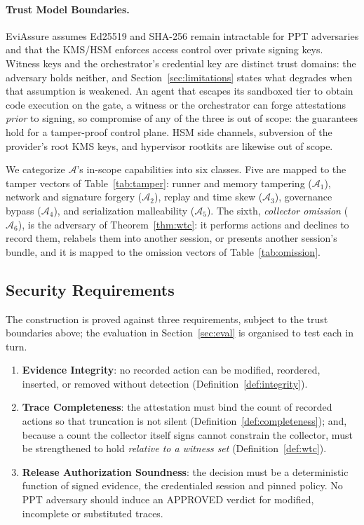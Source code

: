 \documentclass[letterpaper,10pt,twocolumn]{article}
\theoremstyle{definition}
\begin{document}
\paragraph{Trust Model Boundaries.} EviAssure assumes Ed25519 and SHA-256 remain intractable for PPT adversaries and that the KMS/HSM enforces access control over private signing keys. Witness keys and the orchestrator's credential key are distinct trust domains: the adversary holds neither, and Section~\ref{sec:limitations} states what degrades when that assumption is weakened. An agent that escapes its sandboxed tier to obtain code execution on the gate, a witness or the orchestrator can forge attestations \emph{prior} to signing, so compromise of any of the three is out of scope: the guarantees hold for a tamper-proof control plane. HSM side channels, subversion of the provider's root KMS keys, and hypervisor rootkits are likewise out of scope.

We categorize $\mathcal{A}$'s in-scope capabilities into six classes. Five are mapped to the tamper vectors of Table~\ref{tab:tamper}: runner and memory tampering ($\mathcal{A}_1$), network and signature forgery ($\mathcal{A}_2$), replay and time skew ($\mathcal{A}_3$), governance bypass ($\mathcal{A}_4$), and serialization malleability ($\mathcal{A}_5$). The sixth, \emph{collector omission} ($\mathcal{A}_6$), is the adversary of Theorem~\ref{thm:wtc}: it performs actions and declines to record them, relabels them into another session, or presents another session's bundle, and it is mapped to the omission vectors of Table~\ref{tab:omission}.
\subsection{Security Requirements}
The construction is proved against three requirements, subject to the trust boundaries above; the evaluation in Section~\ref{sec:eval} is organised to test each in turn.

\begin{enumerate}
    \item \textbf{Evidence Integrity}: no recorded action can be modified, reordered, inserted, or removed without detection (Definition~\ref{def:integrity}).
    \item \textbf{Trace Completeness}: the attestation must bind the count of recorded actions so that truncation is not silent (Definition~\ref{def:completeness}); and, because a count the collector itself signs cannot constrain the collector, must be strengthened to hold \emph{relative to a witness set} (Definition~\ref{def:wtc}).
    \item \textbf{Release Authorization Soundness}: the decision must be a deterministic function of signed evidence, the credentialed session and pinned policy. No PPT adversary should induce an APPROVED verdict for modified, incomplete or substituted traces.
\end{enumerate}
\end{document}
